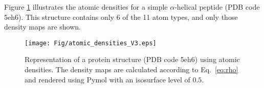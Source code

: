 Figure \ref{Fig:atomic_densities} illustrates the atomic densities for
a simple $\alpha$-helical peptide (PDB code 5eh6). This structure
contains only 6 of the 11 atom types, and only those density maps are
shown.

\begin{figure}[H]
    \centering
    \texttt{[image: Fig/atomic\_densities\_V3.eps]}

    \caption{Representation of a protein structure (PDB code 5eh6)
    using atomic densities. The density maps are calculated according
    to Eq.~\ref{eq:rho} and rendered using Pymol \cite{PyMOL} with an
    isosurface level of $0.5$.}

    \label{Fig:atomic_densities}
\end{figure}
